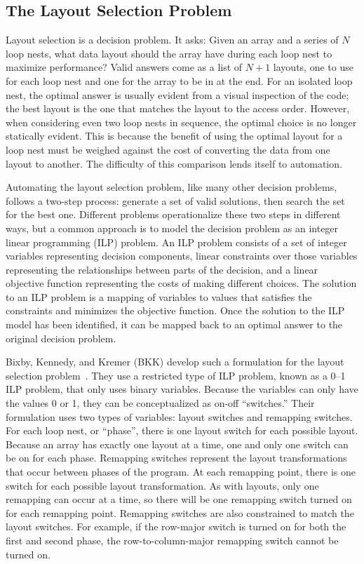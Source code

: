 \subsection{The Layout Selection Problem}

Layout selection is a decision problem.
It asks: Given an array and a series of $N$ loop nests, what data layout should the array have during each loop nest to maximize performance?
Valid answers come as a list of $N+1$ layouts, one to use for each loop nest and one for the array to be in at the end.
For an isolated loop nest, the optimal answer is usually evident from a visual inspection of the code; the best layout is the one that matches the layout to the access order.
However, when considering even two loop nests in sequence, the optimal choice is no longer statically evident.
This is because the benefit of using the optimal layout for a loop nest must be weighed against the cost of converting the data from one layout to another.
The difficulty of this comparison lends itself to automation.

Automating the layout selection problem, like many other decision problems, follows a two-step process: generate a set of valid solutions, then search the set for the best one.
Different problems operationalize these two steps in different ways, but a common approach is to model the decision problem as an integer linear programming (ILP) problem.
An ILP problem consists of a set of integer variables representing decision components, linear constraints over those variables representing the relationships between parts of the decision, and a linear objective function representing the costs of making different choices.
The solution to an ILP problem is a mapping of variables to values that satisfies the constraints and minimizes the objective function.
Once the solution to the ILP model has been identified, it can be mapped back to an optimal answer to the original decision problem.

Bixby, Kennedy, and Kremer (BKK) develop such a formulation for the layout selection problem~\cite{bixby1994automatic,kennedy1995automatic,kennedy1998automatic}.
They use a restricted type of ILP problem, known as a 0--1 ILP problem, that only uses binary variables.
Because the variables can only have the values 0 or 1, they can be conceptualized as on-off ``switches.''
Their formulation uses two types of variables: layout switches and remapping switches.
For each loop nest, or ``phase'', there is one layout switch for each possible layout.
Because an array has exactly one layout at a time, one and only one switch can be on for each phase.
Remapping switches represent the layout transformations that occur between phases of the program.
At each remapping point, there is one switch for each possible layout transformation.
As with layouts, only one remapping can occur at a time, so there will be one remapping switch turned on for each remapping point.
Remapping switches are also constrained to match the layout switches.
For example, if the row-major switch is turned on for both the first and second phase, the row-to-column-major remapping switch cannot be turned on.

